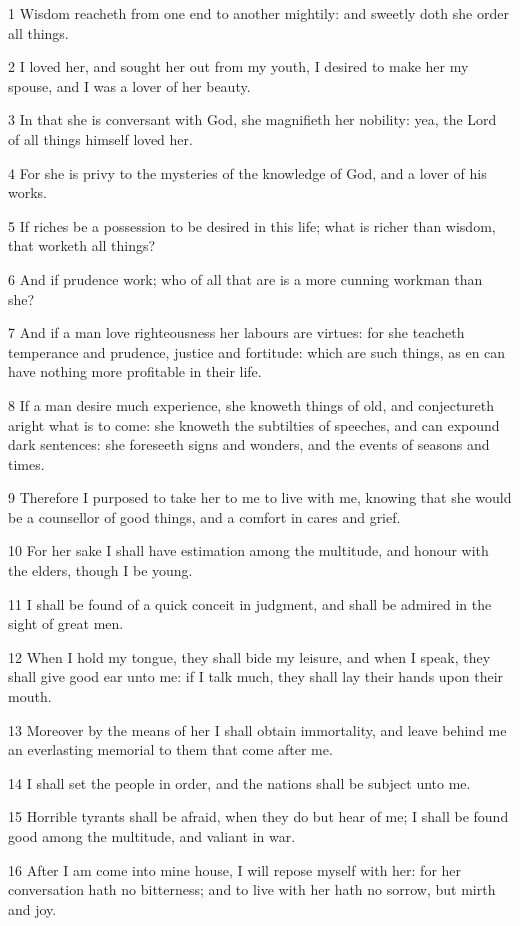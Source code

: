 \par 1 Wisdom reacheth from one end to another mightily: and sweetly doth she order all things.
\par 2 I loved her, and sought her out from my youth, I desired to make her my spouse, and I was a lover of her beauty.
\par 3 In that she is conversant with God, she magnifieth her nobility: yea, the Lord of all things himself loved her.
\par 4 For she is privy to the mysteries of the knowledge of God, and a lover of his works.
\par 5 If riches be a possession to be desired in this life; what is richer than wisdom, that worketh all things?
\par 6 And if prudence work; who of all that are is a more cunning workman than she?
\par 7 And if a man love righteousness her labours are virtues: for she teacheth temperance and prudence, justice and fortitude: which are such things, as en can have nothing more profitable in their life.
\par 8 If a man desire much experience, she knoweth things of old, and conjectureth aright what is to come: she knoweth the subtilties of speeches, and can expound dark sentences: she foreseeth signs and wonders, and the events of seasons and times.
\par 9 Therefore I purposed to take her to me to live with me, knowing that she would be a counsellor of good things, and a comfort in cares and grief.
\par 10 For her sake I shall have estimation among the multitude, and honour with the elders, though I be young.
\par 11 I shall be found of a quick conceit in judgment, and shall be admired in the sight of great men.
\par 12 When I hold my tongue, they shall bide my leisure, and when I speak, they shall give good ear unto me: if I talk much, they shall lay their hands upon their mouth.
\par 13 Moreover by the means of her I shall obtain immortality, and leave behind me an everlasting memorial to them that come after me.
\par 14 I shall set the people in order, and the nations shall be subject unto me.
\par 15 Horrible tyrants shall be afraid, when they do but hear of me; I shall be found good among the multitude, and valiant in war.
\par 16 After I am come into mine house, I will repose myself with her: for her conversation hath no bitterness; and to live with her hath no sorrow, but mirth and joy.
